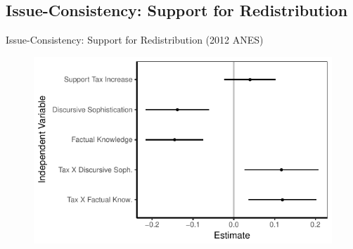 \subsection{Issue-Consistency: Support for Redistribution}
\begin{frame}{Issue-Consistency: Support for Redistribution (2012 ANES)}\label{redistribution}
  \begin{figure}
  \includegraphics{fig/redistribution.pdf}
  \end{figure}
\end{frame}
